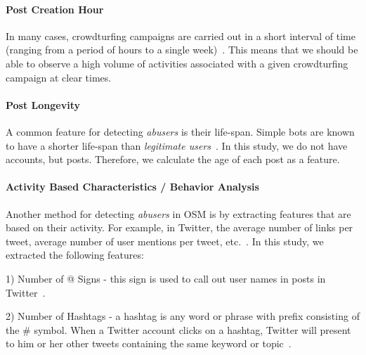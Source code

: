 \documentclass{sig-alternate}
\begin{document}

\paragraph{Post Creation Hour} 
\label{sec:post_creation_hour}

In many cases, crowdturfing campaigns are carried out in a short interval of time (ranging from a period of hours to a single week)~\cite{wang2012serf}.
This means that we should be able to observe a high volume of activities associated with a given crowdturfing campaign at clear times. 

\paragraph{Post Longevity} 
\label{sec:post_longevity}
A common feature for detecting \emph{abusers} is their life-span.
Simple bots are known to have a shorter life-span than \emph{legitimate users}~\cite{lee2013crowdturfers}.  
In this study, we do not have accounts, but posts.
Therefore, we calculate the age of each post as a feature.

\paragraph{Activity Based Characteristics / Behavior Analysis} 
\label{sec:activity_based_characteristics}
Another method for detecting \emph{abusers} in OSM is by extracting features that are based on their activity.
For example, in Twitter, the average number of links per tweet, average number of user mentions per tweet, etc.~\cite{lee2013crowdturfers}.
In this study, we extracted the following features: 

1) Number of @ Signs - this sign is used to call out user names in posts in Twitter~\cite{twitter_glossary}.

2) Number of Hashtags - a hashtag is any word or phrase with prefix consisting of the \# symbol. 
When a Twitter account clicks on a hashtag, Twitter will present to him or her other tweets containing the same keyword or topic~\cite{twitter_glossary}.
\end{document}
